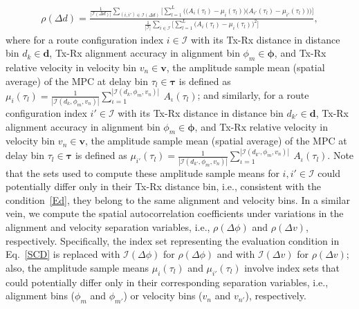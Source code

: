 \documentclass[12pt, draftcls, onecolumn]{IEEEtran}
\begin{document}
{\begin{align}\label{SCD}
    \rho(\Delta d) = \frac{\frac{1}{|\mathcal{I}(\Delta d)|}\sum_{(i,i') \in \mathcal{I}(\Delta d)}\Bigg[\sum_{l = 1}^{L}\bigg(\Big(A_{i}(\tau_{l}) - \mu_{i}(\tau_{l})\Big)\Big(A_{i'}(\tau_{l}) - \mu_{i'}(\tau_{l})\Big)\bigg)\Bigg]}{\frac{1}{|\mathcal{I}|}\sum_{i \in \mathcal{I}}\bigg[\sum_{l = 1}^{L}\Big(A_{i}(\tau_{l}) - \mu_{i}(\tau_{l})\Big)^{2}\bigg]},
\end{align}
where for a route configuration index $i \in \mathcal{I}$ with its Tx-Rx distance in distance bin $d_{k} \in \mathbf{d}$, Tx-Rx alignment accuracy in alignment bin $\phi_{m} \in \boldsymbol{\phi}$, and Tx-Rx relative velocity in velocity bin $v_{n} \in \mathbf{v}$, the amplitude sample mean (spatial average) of the MPC at delay bin $\tau_{l} \in \boldsymbol{\tau}$ is defined as $\mu_{i}(\tau_{l}) = \frac{1}{|\mathcal{I}(d_{k}, \phi_{m}, v_{n})|}\sum_{\iota = 1}^{|\mathcal{I}(d_{k}, \phi_{m}, v_{n})|}\ A_{\iota}(\tau_{l})$; and similarly, for a route configuration index $i' \in \mathcal{I}$ with its Tx-Rx distance in distance bin $d_{k'} \in \mathbf{d}$, Tx-Rx alignment accuracy in alignment bin $\phi_{m} \in \boldsymbol{\phi}$, and Tx-Rx relative velocity in velocity bin $v_{n} \in \mathbf{v}$, the amplitude sample mean (spatial average) of the MPC at delay bin $\tau_{l} \in \boldsymbol{\tau}$ is defined as $\mu_{i'}(\tau_{l}) = \frac{1}{|\mathcal{I}(d_{k'}, \phi_{m}, v_{n})|}\sum_{\iota = 1}^{|\mathcal{I}(d_{k'}, \phi_{m}, v_{n})|}\ A_{\iota}(\tau_{l})$. Note that the sets used to compute these amplitude sample means for $i, i' \in \mathcal{I}$ could potentially differ only in their Tx-Rx distance bin, i.e., consistent with the condition~\eqref{Ed}, they belong to the same alignment and velocity bins. In a similar vein, we compute the spatial autocorrelation coefficients under variations in the alignment and velocity separation variables, i.e., $\rho(\Delta \phi)$ and $\rho(\Delta v)$, respectively. Specifically, the index set representing the evaluation condition in Eq.~\ref{SCD} is replaced with $\mathcal{I}(\Delta \phi)$ for $\rho(\Delta \phi)$ and with $\mathcal{I}(\Delta v)$ for $\rho(\Delta v)$; also, the amplitude sample means $\mu_{i}(\tau_{l})$ and $\mu_{i'}(\tau_{l})$ involve index sets that could potentially differ only in their corresponding separation variables, i.e., alignment bins ($\phi_{m}$ and $\phi_{m'}$) or velocity bins ($v_{n}$ and $v_{n'}$), respectively.\\
\begin{figure} [t]
    \centering

\end{figure}}
\end{document}
